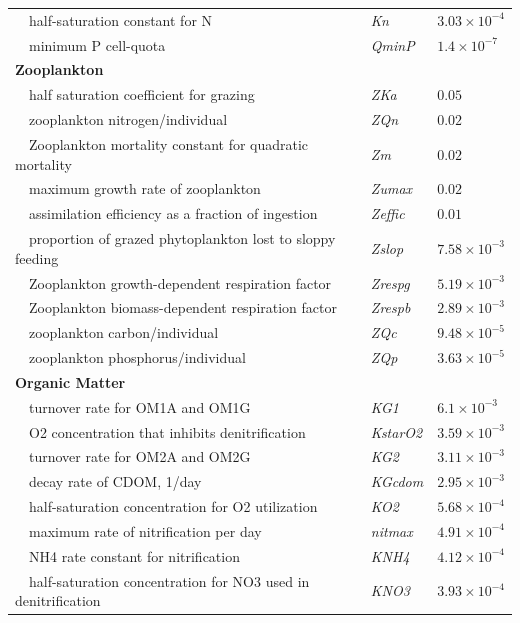 \documentclass[letterpaper,12pt,oneside]{article}\usepackage[]{graphicx}\usepackage[]{color}
\begin{document}
\begin{table}[!tbp]
{\begin{center}
\begin{tabular}{lll}
~~half-saturation constant for N&\textit{Kn}&$3.03\times 10^{-4}$\tabularnewline
~~minimum P cell-quota&\textit{QminP}&$1.4\times 10^{-7}$\tabularnewline
\hline
{\bfseries Zooplankton}&&\tabularnewline
~~half saturation coefficient for grazing&\textit{ZKa}&$0.05$\tabularnewline
~~zooplankton nitrogen/individual&\textit{ZQn}&$0.02$\tabularnewline
~~Zooplankton mortality constant for quadratic mortality&\textit{Zm}&$0.02$\tabularnewline
~~maximum growth rate of zooplankton&\textit{Zumax}&$0.02$\tabularnewline
~~assimilation efficiency as a fraction of ingestion&\textit{Zeffic}&$0.01$\tabularnewline
~~proportion of grazed phytoplankton lost to sloppy feeding&\textit{Zslop}&$7.58\times 10^{-3}$\tabularnewline
~~Zooplankton growth-dependent respiration factor&\textit{Zrespg}&$5.19\times 10^{-3}$\tabularnewline
~~Zooplankton biomass-dependent respiration factor&\textit{Zrespb}&$2.89\times 10^{-3}$\tabularnewline
~~zooplankton carbon/individual&\textit{ZQc}&$9.48\times 10^{-5}$\tabularnewline
~~zooplankton phosphorus/individual&\textit{ZQp}&$3.63\times 10^{-5}$\tabularnewline
\hline
{\bfseries Organic Matter}&&\tabularnewline
~~turnover rate for OM1A and OM1G&\textit{KG1}&$6.1\times 10^{-3}$\tabularnewline
~~O2 concentration that inhibits denitrification&\textit{KstarO2}&$3.59\times 10^{-3}$\tabularnewline
~~turnover rate for OM2A and OM2G&\textit{KG2}&$3.11\times 10^{-3}$\tabularnewline
~~decay rate of CDOM, 1/day&\textit{KGcdom}&$2.95\times 10^{-3}$\tabularnewline
~~half-saturation concentration for O2 utilization&\textit{KO2}&$5.68\times 10^{-4}$\tabularnewline
~~maximum rate of nitrification per day&\textit{nitmax}&$4.91\times 10^{-4}$\tabularnewline
~~NH4 rate constant for nitrification&\textit{KNH4}&$4.12\times 10^{-4}$\tabularnewline
~~half-saturation concentration for NO3 used in denitrification&\textit{KNO3}&$3.93\times 10^{-4}$\tabularnewline
\hline
\end{tabular}\end{center}}

\end{table}
\end{document}
